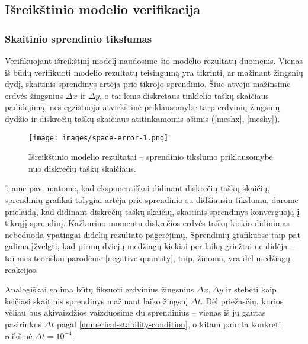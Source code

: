\subsection{Išreikštinio modelio verifikacija}

\subsubsection*{Skaitinio sprendinio tikslumas}

Verifikuojant išreikštinį modelį naudosime šio modelio rezultatų duomenis. Vienas iš būdų verifikuoti modelio rezultatų teisingumą yra tikrinti, ar mažinant žingsnių dydį, skaitinis sprendinys artėja prie tikrojo sprendinio. Šiuo atveju mažinsime erdvės žingsnius $\Delta x$ ir $\Delta y$, o tai lems diskretaus tinklelio taškų skaičiaus padidėjimą, nes egzistuoja atvirkštinė priklausomybė tarp erdvinių žingsnių dydžio ir diskrečių taškų skaičiaus atitinkamomis ašimis (\ref{meshx}, \ref{meshy}).

\newpage

\begin{figure}[h!]
    \centering
    \texttt{[image: images/space-error-1.png]}

    \caption{Išreikštinio modelio rezultatai -- sprendinio tikslumo priklausomybė nuo diskrečių taškų skaičiaus. }

    \label{results-space-error}
\end{figure}

\ref{results-space-error}-ame pav. matome, kad eksponentiškai didinant diskrečių taškų skaičių, sprendinių grafikai tolygiai artėja prie sprendinio su didžiausiu tikslumu, darome prielaidą, kad didinant diskrečių taškų skaičių, skaitinis sprendinys konverguoją į tikrąjį sprendinį. Kažkuriuo momentu diskrečios erdvės taškų kiekio didinimas nebeduoda ypatingai didelių rezultato pagerėjimų. Sprendinių grafikuose taip pat galima įžvelgti, kad pirmų dviejų medžiagų kiekiai per laiką griežtai ne didėja -- tai mes teoriškai parodėme \eqref{negative-quantity}, taip, žinoma, yra dėl  medžiagų reakcijos. 

Analogiškai galima būtų fiksuoti erdvinius žingsnius $\Delta x, \Delta y$ ir stebėti kaip keičiasi skaitinis sprendinys mažinant laiko žingsnį $\Delta t$. Dėl priežasčių, kurios vėliau bus akivaizdžios vaizduosime du sprendinius -- vienas iš jų gautas pasirinkus $\Delta t$ pagal \eqref{numerical-stability-condition}, o kitam paimta konkreti reikšmė $\Delta t = 10^{-4}$.

